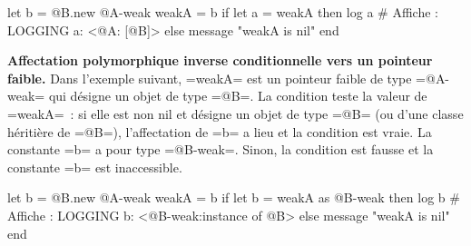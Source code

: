 \begin{galgas}
  let b = @B.new
  @A-weak weakA = b
  if let a = weakA then
    log a # Affiche : LOGGING a: <@A: [@B]>
  else
    message "weakA is nil\n"
  end
\end{galgas}


{\bf Affectation polymorphique inverse conditionnelle vers un pointeur faible.} Dans l'exemple suivant, \ggs=weakA= est un pointeur faible de type \ggs=@A-weak= qui désigne un objet de type \ggs=@B=. La condition teste la valeur de \ggs=weakA=~: si elle est non nil et désigne un objet de type \ggs=@B= (ou d'une classe héritière de \ggs=@B=), l'affectation de \ggs=b= a lieu et la condition est vraie. La constante \ggs=b= a pour type \ggs=@B-weak=. Sinon, la condition est fausse et la constante \ggs=b= est inaccessible.

\begin{galgas}
  let b = @B.new
  @A-weak weakA = b
  if let b = weakA as @B-weak then
    log b # Affiche : LOGGING b: <@B-weak:instance of @B>
  else
    message "weakA is nil\n"
  end
\end{galgas}

